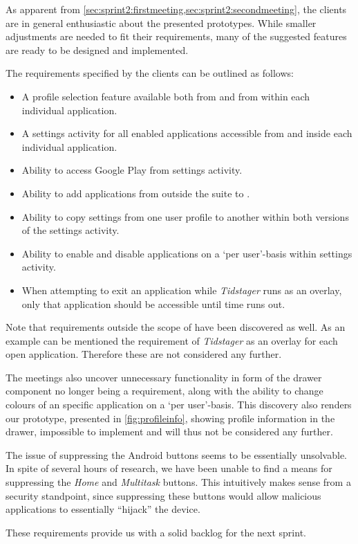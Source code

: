 As apparent from \cref{sec:sprint2:firstmeeting,sec:sprint2:secondmeeting}, the clients are in general enthusiastic about the presented prototypes.
While smaller adjustments are needed to fit their requirements, many of the suggested features are ready to be designed and implemented.

The requirements specified by the clients can be outlined as follows:

\begin{itemize}
\item A profile selection feature available both from \launcher and from within each individual application.
\item A settings activity for all enabled applications accessible from \launcher and inside each individual application.
\item Ability to access Google Play from \launcher settings activity.
\item Ability to add applications from outside the \giraf suite to \launcher.
\item Ability to copy settings from one user profile to another within both versions of the settings activity.
\item Ability to enable and disable applications on a `per user'-basis within \launcher settings activity.
\item When attempting to exit an application while \textit{Tidstager} runs as an overlay, only that application should be accessible until time runs out.
\end{itemize}

Note that requirements outside the scope of \launcher have been discovered as well.
As an example can be mentioned the requirement of \textit{Tidstager} as an overlay for each open application.
Therefore these are not considered any further.

The meetings also uncover unnecessary functionality in form of the drawer component no longer being a requirement, along with the ability to change colours of an specific application on a `per user'-basis.
This discovery also renders our prototype, presented in \cref{fig:profileinfo}, showing profile information in the drawer, impossible to implement and will thus not be considered any further.

The issue of suppressing the Android buttons seems to be essentially unsolvable. 
In spite of several hours of research, we have been unable to find a means for suppressing the \textit{Home} and \textit{Multitask} buttons. 
This intuitively makes sense from a security standpoint, since suppressing these buttons would allow malicious applications to essentially ``hijack'' the device.

These requirements provide us with a solid backlog for the next sprint.